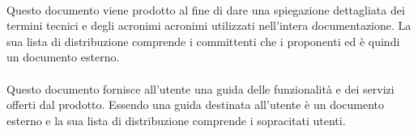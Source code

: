 \paragraph{\glossario}
Questo documento viene prodotto al fine di dare una spiegazione dettagliata dei termini tecnici e degli acronimi acronimi utilizzati nell'intera documentazione. La sua lista di distribuzione comprende i committenti che i proponenti ed è quindi un documento esterno.

\paragraph{\MU}
Questo documento fornisce all'utente una guida delle funzionalità e dei servizi offerti dal prodotto. Essendo una guida destinata all'utente è un documento esterno e la sua lista di distribuzione comprende i sopracitati utenti.

